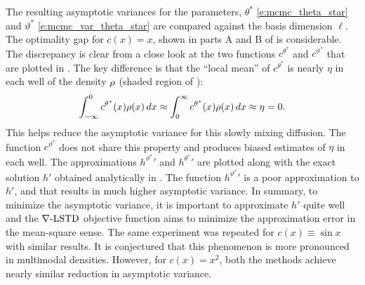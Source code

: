 The resulting asymptotic variances for the parameters, $\theta^*$ \eqref{e:mcmc_theta_star} and $\vartheta^*$ \eqref{e:mcmc_var_theta_star} are compared against the basis dimension $\ell$.  The optimality gap for $c(x) = x$, shown in parts A and B of  is considerable.
The discrepancy is clear from a close look at the two functions $c^{\theta^*}$ and $c^{\vartheta^*}$ that are plotted in . The key difference is that the ``local mean'' of $c^{\theta^*}$ is nearly $\eta$ in each well of the density $\rho$ (shaded region of ):
\[
\begin{aligned}
\int_{-\infty}^0 c^{\theta^*}(x) \rho(x)\, dx	
\approx
\int_0^\infty c^{\theta^*}(x) \rho(x) \, dx \approx \eta =0.
\end{aligned}
\]
This helps reduce the asymptotic variance for this slowly mixing diffusion. The function $c^{\vartheta^*}$  does not share this property and produces biased estimates of $\eta$ in each well.
The approximations ${h^{\vartheta^*}}'$ and ${h^{\theta^*}}'$ are plotted along with the exact solution $h'$ obtained analytically in
.  The function ${h^{\vartheta^*}}'$ is a poor approximation to $h'$,  and that results in much higher asymptotic variance. In summary, to minimize the asymptotic variance, it is  important to approximate $h'$ quite well and the $\nabla\text{-LSTD}$ objective function aims to minimize the approximation error in the mean-square sense. The same experiment was repeated for $c(x) \equiv\sin x$ with similar results. It is conjectured that this phenomenon is more pronounced in multimodal densities. However, for $c(x) = x^2$, both the methods achieve nearly similar reduction in asymptotic variance. 

